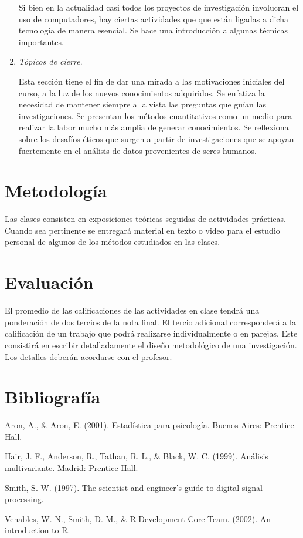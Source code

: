 \documentclass[letterpaper,11pt]{article}
\begin{document}
\begin{enumerate}
 Si bien en la actualidad casi todos los proyectos de investigación involucran el uso de computadores, hay ciertas actividades que que están ligadas a dicha tecnología de manera esencial. Se hace una introducción a algunas técnicas importantes.

  \item \emph{Tópicos de cierre}.

 Esta sección tiene el fin de dar una mirada a las motivaciones iniciales del curso, a la luz de los nuevos conocimientos adquiridos. Se enfatiza la necesidad de mantener siempre a la vista las preguntas que guían las investigaciones. Se presentan los métodos cuantitativos como un medio para realizar la labor mucho más amplia de generar conocimientos. Se reflexiona sobre los desafíos éticos que surgen a partir de investigaciones que se apoyan fuertemente en el análisis de datos provenientes de seres humanos.
 
\end{enumerate}

\section{Metodolog\'ia}

Las clases consisten en exposiciones teóricas seguidas de actividades prácticas. Cuando sea pertinente se entregará material en texto o video para el estudio personal de algunos de los métodos estudiados en las clases.

\section{Evaluación}

El promedio de las calificaciones de las actividades en clase tendrá una ponderación de dos tercios de la nota final. El tercio adicional corresponderá a la calificación de un trabajo que podrá realizarse individualmente o en parejas. Este consistirá en escribir detalladamente el diseño metodológico de una investigación. Los detalles deberán acordarse con el profesor.

\section{Bibliografía}

{\leftskip 0.5in
\parindent -0.5in

Aron, A., \& Aron, E. (2001). Estadística para psicología. Buenos Aires: Prentice Hall.

Hair, J. F., Anderson, R., Tathan, R. L., \& Black, W. C. (1999). Análisis multivariante. Madrid: Prentice Hall.

Smith, S. W. (1997). The scientist and engineer's guide to digital signal processing.

Venables, W. N., Smith, D. M., \& R Development Core Team. (2002). An introduction to R.

}
\end{document}
